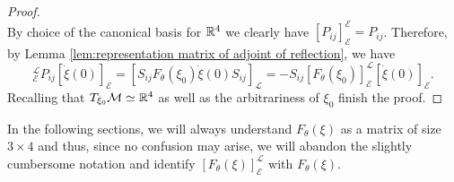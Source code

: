 \begin{proof}
\begin{equation}
\end{equation}
By choice of the canonical basis for $\mathbb{R}^4$ we clearly have $[P_{ij}]_{\mathcal{E}}^{\mathcal{E}} = P_{ij}$. Therefore, by Lemma \ref{lem:representation matrix of adjoint of reflection}, we have
\begin{equation}
	[F_{\theta}(P_{ij} \xi_0)]_{\mathcal{E}}^{\mathcal{L}}  P_{ij} [\dot{\xi}(0)]_{\mathcal{E}} = [S_{ij} F_{\theta}(\xi_0) \dot{\xi}(0) S_{ij}]_{\mathcal{L}} = -S_{ij} [F_{\theta}(\xi_0)]_{\mathcal{E}}^{\mathcal{L}} [\dot{\xi}(0)]_{\mathcal{E}}.
\end{equation}
Recalling that $T_{\xi_0} \mathcal{M} \simeq \mathbb{R}^4$ as well as the arbitrariness of $\xi_0$ finish the proof.
\end{proof}

In the following sections, we will always understand $F_{\theta}(\xi)$ as a matrix of size $3 \times 4$ and thus, since no confusion may arise, we will abandon the slightly cumbersome notation and identify $[F_{\theta}(\xi)]_{\mathcal{E}}^{\mathcal{L}}$ with $F_{\theta}(\xi)$.





